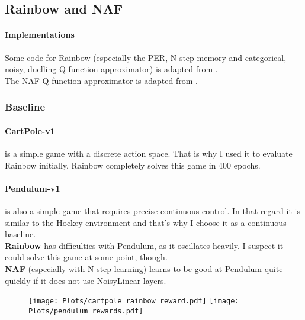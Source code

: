 \subsection{Rainbow and NAF}

\paragraph{Implementations}
Some code for Rainbow (especially the PER, N-step memory and categorical, noisy, duelling Q-function approximator) is adapted from \cite{rainbow_GitHub}.\\
The NAF Q-function approximator is adapted from \cite{NAF_GitHub}.

\subsubsection{Baseline}

\paragraph{CartPole-v1} is a simple game with a discrete action space. That is why I used it to evaluate Rainbow initially.
Rainbow completely solves this game in 400 epochs.\\
\paragraph{Pendulum-v1} is also a simple game that requires precise continuous control. 
In that regard it is similar to the Hockey environment and that's why I choose it as a continuous baseline.\\
\textbf{Rainbow} has difficulties with Pendulum, as it oscillates heavily. I suspect it could solve this game at some point, though.\\
\textbf{NAF} (especially with N-step learning) learns to be good at Pendulum quite quickly if it does not use NoisyLinear layers.
\begin{figure}[h]
    \texttt{[image: Plots/cartpole\_rainbow\_reward.pdf]}
    \texttt{[image: Plots/pendulum\_rewards.pdf]}
\end{figure}


